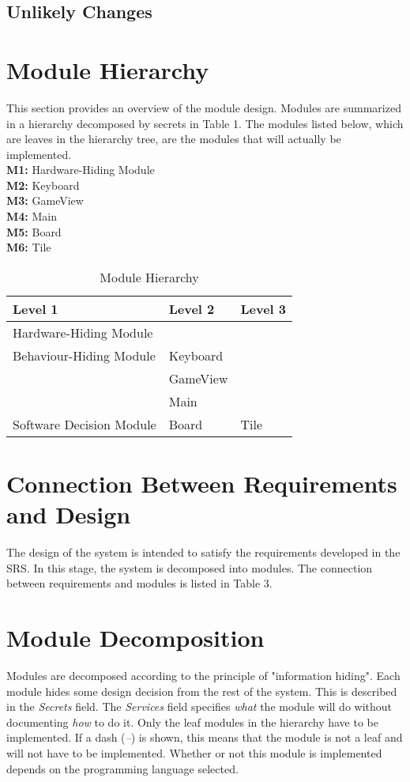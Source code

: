 \documentclass[12pt]{article}
\begin{document}
\subsection{Unlikely Changes}

\section{Module Hierarchy}
This section provides an overview of the module design. Modules are summarized 
in a hierarchy decomposed by secrets in Table 1. The modules listed below, 
which are leaves in the hierarchy tree, are the modules that will actually be 
implemented.\bigskip\\
\textbf{M1:} Hardware-Hiding Module \\
\textbf{M2:} Keyboard \\
\textbf{M3:} GameView\\
\textbf{M4:} Main\\
\textbf{M5:} Board\\
\textbf{M6:} Tile\\

\begin{table}[!htbp]
	\centering
	\begin{tabular}{p{5cm}|p{4cm}|p{4cm}}
		\textbf{Level 1} & \textbf{Level 2} & \textbf{Level 3} \\\hline
		Hardware-Hiding Module & \\\hline
		Behaviour-Hiding Module & Keyboard & \\
		& GameView & \\
		& Main & \\\hline
		Software Decision Module & Board & Tile\\\hline
		
	\end{tabular}
	\smallskip
	\caption{Module Hierarchy}
	\label{Module Hierarchy}	
\end{table}

\section{Connection Between Requirements and Design}
The design of the system is intended to satisfy the requirements developed in the SRS. In this stage, the system is decomposed into modules. The connection between requirements and modules is listed in Table 3.

\section{Module Decomposition}
Modules are decomposed according to the principle of "information hiding". Each module hides some design decision from the rest of the system. This is described in the \textit{Secrets} field. The \textit{Services} field specifies \textit{what} the module will do without documenting \textit{how} to do it. Only the leaf modules in the hierarchy have to be implemented. If a dash (\emph{--}) is shown, this means that the module is not a leaf and will not have to be implemented. Whether or not this module is implemented depends on the programming language selected.
\end{document}

